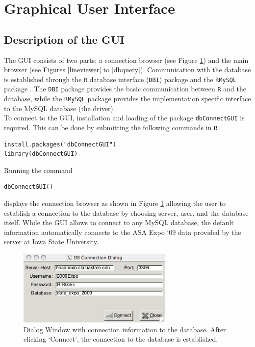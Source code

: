 \documentclass[11pt]{tise_style}
\begin{document}
\section{{Graphical User Interface}}

\subsection{Description of the GUI}

The GUI consists of two parts: a connection browser (see Figure \ref{dbconnect}) and the main
browser (see Figures \ref{lineviewer}  to \ref{dbquery}). Communication with the database is established through the {\tt R} database interface ({\tt DBI}) package \citep{dbi} and the {\tt RMySQL} package \citep{rmysql}. The  {\tt DBI}  package provides the basic  communication between {\tt R} and the database, while the {\tt RMySQL} package provides the implementation specific interface to the MySQL database (the driver).\\
To connect to the GUI, installation and loading of the package {\tt dbConnectGUI} is required. This can be done by submitting the following commands in {\tt R}
\vspace{-0.5cm}
\begin{verbatim}
install.packages("dbConnectGUI")
library(dbConnectGUI)
\end{verbatim} \vspace{-0.5cm}

Running the command \vspace{-0.5cm}
\begin{verbatim}
dbConnectGUI()
\end{verbatim} \vspace{-0.5cm}

displays the connection browser as shown in Figure  \ref{dbconnect} allowing the user to establish a connection to the database by choosing server, user, and the database itself. While the GUI allows to connect to any MySQL database, the default information automatically connects to the ASA Expo `09 data provided by the server at Iowa State University. \\[.25cm]



\begin{figure}[htbp] %
   \centering
   \includegraphics[width=3in]{dbconnect-dialog.png} 
   \caption{Dialog Window with connection information to the database. After clicking `Connect', the connection to the database is established.}
   \label{dbconnect}
\end{figure}
\end{document}
